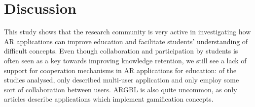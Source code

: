 \section{Discussion} \label{sec:discussion}

This study shows that the research community is very active in investigating how \gls{AR} applications can improve education and facilitate students' understanding of difficult concepts.
Even though collaboration and participation by students is often seen as a key towards improving knowledge retention, we still see a lack of support for cooperation mechanisms in AR applications for education: of the \papersSelected studies analysed, only \papersMultiuser described multi-user application and only \papersCollab employ some sort of collaboration between users. \gls{ARGBL} is also quite uncommon, as only \papersGames articles describe applications which implement gamification concepts. 

